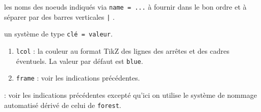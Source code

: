 \documentclass[12pt,a4paper]{article}
\theoremstyle{definition}
\newcommand\extraspace{
    \vspace{0.25em}
}
\begin{document}
\IDarg{} les noms des noeuds indiqués via \verb#name = ...# à fournir dans le bon ordre et à séparer par des barres verticales \verb#|# .


\bigskip



\IDoption{} un système de type \texttt{clé = valeur}.

\begin{enumerate}    
    \item \verb#lcol# : la couleur au format TikZ des lignes des arrêtes et des cadres éventuels. La valeur par défaut est \verb#blue#.

    \extraspace
    
    \item \verb#frame# : voir les indications précédentes.
\end{enumerate}

\IDarg{} : voir les indications précédentes excepté qu'ici on utilise le système de nommage automatisé dérivé de celui de \verb#forest#.
\end{document}

